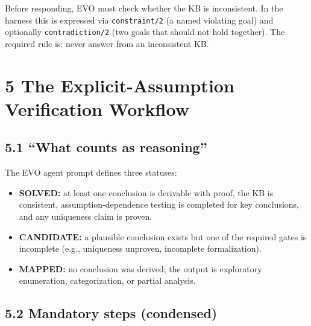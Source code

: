 \documentclass[12pt,a4paper]{article}
\begin{document}
Before responding, EVO must check whether the KB is inconsistent. In the harness this is expressed via \texttt{constraint/2} (a named violating goal) and optionally \texttt{contradiction/2} (two goals that should not hold together). The required rule is: never answer from an inconsistent KB.

\section{5 The Explicit-Assumption Verification Workflow}

\subsection{5.1 ``What counts as reasoning''}

The EVO agent prompt defines three statuses:
\begin{itemize}[leftmargin=*,topsep=2pt,itemsep=2pt]
\item \textbf{SOLVED:} at least one conclusion is derivable with proof, the KB is consistent, assumption-dependence testing is completed for key conclusions, and any uniqueness claim is proven.
\item \textbf{CANDIDATE:} a plausible conclusion exists but one of the required gates is incomplete (e.g., uniqueness unproven, incomplete formalization).
\item \textbf{MAPPED:} no conclusion was derived; the output is exploratory enumeration, categorization, or partial analysis.
\end{itemize}

\subsection{5.2 Mandatory steps (condensed)}
\end{document}
